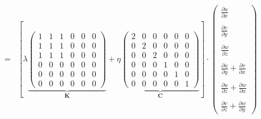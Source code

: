 \begin{eqnarray}
&=&
\left[
\lambda
\underbrace{
\left(
\begin{array}{cccccc}
1 & 1 & 1 & 0 & 0 & 0 \\
1 & 1 & 1 & 0 & 0 & 0 \\
1 & 1 & 1 & 0 & 0 & 0 \\
0 & 0 & 0 & 0 & 0 & 0 \\
0 & 0 & 0 & 0 & 0 & 0 \\
0 & 0 & 0 & 0 & 0 & 0 
\end{array}
\right)}_{\bm K}
+ \eta
\underbrace{
\left(
\begin{array}{cccccc}
2 & 0 & 0 & 0 & 0 & 0 \\ 
0 & 2 & 0 & 0 & 0 & 0 \\ 
0 & 0 & 2 & 0 & 0 & 0 \\ 
0 & 0 & 0 & 1 & 0 & 0 \\
0 & 0 & 0 & 0 & 1 & 0 \\
0 & 0 & 0 & 0 & 0 & 1 
\end{array}
\right)
}_{\bm C}
\right]
\cdot
\left(
\begin{array}{c}
\frac{\partial u}{\partial x} \\ \\
\frac{\partial v}{\partial y} \\ \\
\frac{\partial w}{\partial z} \\ \\
\frac{\partial u}{\partial y} + \frac{\partial v}{\partial x} \\ \\
\frac{\partial u}{\partial z} + \frac{\partial w}{\partial x} \\ \\
\frac{\partial v}{\partial z} + \frac{\partial w}{\partial y} 
\end{array}
\right) \nonumber
\end{eqnarray}



